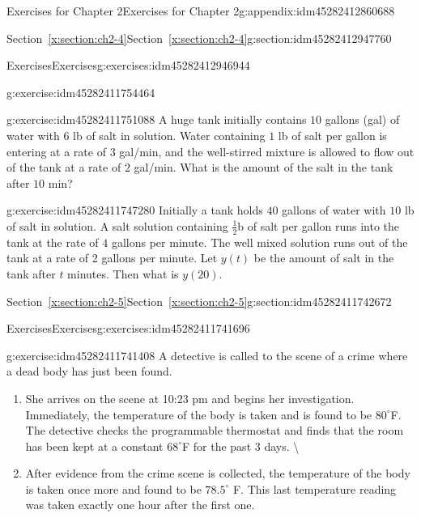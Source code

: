 \documentclass[oneside,10pt,]{book}
\numberwithin{equation}{section}
\numberwithin{equation}{section}
\begin{document}
\begin{appendixptx}{Exercises for Chapter 2}{}{Exercises for Chapter 2}{}{}{g:appendix:idm45282412860688}
\begin{sectionptx}{Section~\ref*{x:section:ch2-4}}{}{Section~\ref*{x:section:ch2-4}}{}{}{g:section:idm45282412947760}
\begin{exercises-subsection-numberless}{Exercises}{}{Exercises}{}{}{g:exercises:idm45282412946944}
\begin{divisionexercise}{5}{}{}{g:exercise:idm45282411754464}
\end{divisionexercise}%
\begin{divisionexercise}{6}{}{}{g:exercise:idm45282411751088}%
A huge tank initially contains \(10\) gallons (gal) of water with \(6\) lb of salt in solution. Water containing \(1\) lb of salt per gallon is entering at a rate of \(3\) gal\slash{}min, and the well-stirred mixture is allowed to flow out of the tank at a rate of \(2\) gal\slash{}min. What is the amount of the salt in the tank after \(10\) min?%
\end{divisionexercise}%
\begin{divisionexercise}{7}{}{}{g:exercise:idm45282411747280}%
Initially a tank holds \(40\) gallons of water with \(10\) lb of salt in solution. A salt solution containing \(\frac{1}{2}\)b of salt per gallon runs into the tank at the rate of \(4\) gallons per minute. The well mixed solution runs out of the tank at a rate of 2 gallons per minute. Let \(y(t)\) be the amount of salt in the tank after \(t\) minutes. Then what is \(y(20)\).%
\end{divisionexercise}%
\end{exercises-subsection-numberless}
\end{sectionptx}
%
%
\typeout{************************************************}
\typeout{************************************************}
%
\begin{sectionptx}{Section~\ref*{x:section:ch2-5}}{}{Section~\ref*{x:section:ch2-5}}{}{}{g:section:idm45282411742672}
%
%
\typeout{************************************************}
\typeout{************************************************}
%
\begin{exercises-subsection-numberless}{Exercises}{}{Exercises}{}{}{g:exercises:idm45282411741696}
\begin{divisionexercise}{1}{}{}{g:exercise:idm45282411741408}%
A detective is called to the scene of a crime where a dead body has just been found.%
\begin{enumerate}[label=(\alph*)]
\item{}She arrives on the scene at 10:23 pm and begins her investigation. Immediately, the temperature of the body is taken and is found to be \(80^{\circ}\)F. The detective checks the programmable thermostat and finds that the room has been kept at a constant \(68^{\circ}\)F for the past 3 days.%
 \textbackslash{}\item{}After evidence from the crime scene is collected, the temperature of the body is taken once more and found to be \(78.5^{\circ}\) F. This last temperature reading was taken exactly one hour after the first one.%

\end{enumerate}
\end{divisionexercise}
\end{exercises-subsection-numberless}
\end{sectionptx}
\end{appendixptx}
\end{document}
